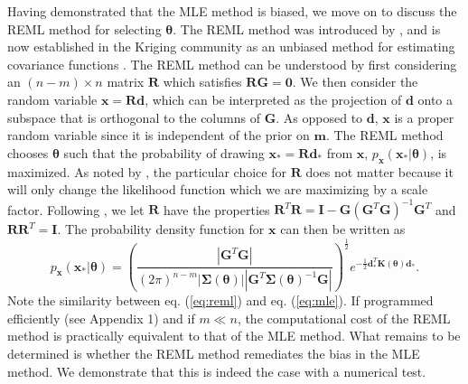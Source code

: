 \documentclass{svjour3}                     %
\begin{document}
Having demonstrated that the MLE method is biased, we move on to discuss the REML method for selecting $\mathbf{\theta}$.  The REML method was introduced by \citet{Patterson1971}, and is now established in the Kriging community as an unbiased method for estimating covariance functions \citep[e.g.,][]{Cressie1992}. The REML method can be understood by first considering an $(n-m)\times n$ matrix $\mathbf{R}$ which satisfies $\mathbf{R}\mathbf{G}=\mathbf{0}$.  We then consider the random variable $\mathbf{x}=\mathbf{R}\mathbf{d}$, which can be interpreted as the projection of $\mathbf{d}$ onto a subspace that is orthogonal to the columns of $\mathbf{G}$. As opposed to $\mathbf{d}$, $\mathbf{x}$ is a proper random variable since it is independent of the prior on $\mathbf{m}$. The REML method chooses $\mathbf{\theta}$ such that the probability of drawing $\mathbf{x}_*=\mathbf{R}\mathbf{d}_*$ from $\mathbf{x}$, $p_\mathbf{x}(\mathbf{x}_*|\mathbf{\theta})$, is maximized. As noted by \citet{Harville1974}, the particular choice for $\mathbf{R}$ does not matter because it will only change the likelihood function which we are maximizing by a scale factor. Following \citet{Harville1974}, we let $\mathbf{R}$ have the properties $\mathbf{R}^T\mathbf{R} = \mathbf{I} - \mathbf{G}(\mathbf{G}^T\mathbf{G})^{-1}\mathbf{G}^T$ and $\mathbf{R}\mathbf{R}^T = \mathbf{I}$. The probability density function for $\mathbf{x}$ can then be written as 
\begin{equation}\label{eq:reml}
p_\mathbf{x}(\mathbf{x}_*|\mathbf{\theta}) =
\left(\frac{\left|\mathbf{G}^T\mathbf{G}\right|}
           {(2\pi)^{n-m}
            \left| \mathbf{\Sigma}(\mathbf{\theta}) \right| 
            \left| \mathbf{G}^T\mathbf{\Sigma}(\mathbf{\theta})^{-1}\mathbf{G} \right|}\right)^{\frac{1}{2}} 
e^{-\tfrac{1}{2}\mathbf{d}_*^T\mathbf{K}(\mathbf{\theta})\mathbf{d}_*}.
\end{equation}
Note the similarity between eq. (\ref{eq:reml}) and eq. (\ref{eq:mle}). If programmed efficiently (see Appendix 1) and if $m \ll n$, the computational cost of the REML method is practically equivalent to that of the MLE method. What remains to be determined is whether the REML method remediates the bias in the MLE method. We demonstrate that this is indeed the case with a numerical test. 
\end{document}

